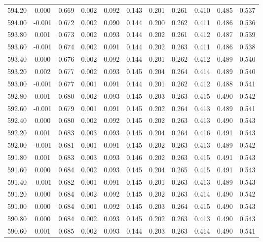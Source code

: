 \begin{longtable}{cccccccccc}
    594.20 &  0.000 &  0.669 &  0.002 &  0.092 &  0.143 &  0.201 &  0.261 &  0.410 &  0.485 &  0.537 \\
    594.00 & -0.001 &  0.672 &  0.002 &  0.090 &  0.144 &  0.200 &  0.262 &  0.411 &  0.486 &  0.536 \\
    593.80 &  0.001 &  0.673 &  0.002 &  0.093 &  0.144 &  0.202 &  0.261 &  0.412 &  0.487 &  0.539 \\
    593.60 & -0.001 &  0.674 &  0.002 &  0.091 &  0.144 &  0.202 &  0.263 &  0.411 &  0.486 &  0.538 \\
    593.40 &  0.000 &  0.676 &  0.002 &  0.092 &  0.144 &  0.201 &  0.262 &  0.412 &  0.489 &  0.540 \\
    593.20 &  0.002 &  0.677 &  0.002 &  0.093 &  0.145 &  0.204 &  0.264 &  0.414 &  0.489 &  0.540 \\
    593.00 & -0.001 &  0.677 &  0.001 &  0.091 &  0.144 &  0.201 &  0.262 &  0.412 &  0.488 &  0.541 \\
    592.80 &  0.001 &  0.680 &  0.002 &  0.093 &  0.145 &  0.203 &  0.263 &  0.415 &  0.490 &  0.542 \\
    592.60 & -0.001 &  0.679 &  0.001 &  0.091 &  0.145 &  0.202 &  0.264 &  0.413 &  0.489 &  0.541 \\
    592.40 &  0.000 &  0.680 &  0.002 &  0.092 &  0.145 &  0.202 &  0.263 &  0.413 &  0.490 &  0.543 \\
    592.20 &  0.001 &  0.683 &  0.003 &  0.093 &  0.145 &  0.204 &  0.264 &  0.416 &  0.491 &  0.543 \\
    592.00 & -0.001 &  0.681 &  0.001 &  0.091 &  0.145 &  0.202 &  0.263 &  0.413 &  0.489 &  0.542 \\
    591.80 &  0.001 &  0.683 &  0.003 &  0.093 &  0.146 &  0.202 &  0.263 &  0.415 &  0.491 &  0.543 \\
    591.60 &  0.000 &  0.684 &  0.002 &  0.093 &  0.145 &  0.204 &  0.265 &  0.415 &  0.491 &  0.543 \\
    591.40 & -0.001 &  0.682 &  0.001 &  0.091 &  0.145 &  0.201 &  0.263 &  0.413 &  0.489 &  0.543 \\
    591.20 &  0.000 &  0.684 &  0.002 &  0.092 &  0.145 &  0.202 &  0.263 &  0.414 &  0.490 &  0.542 \\
    591.00 &  0.000 &  0.684 &  0.001 &  0.092 &  0.145 &  0.203 &  0.264 &  0.415 &  0.490 &  0.543 \\
    590.80 &  0.000 &  0.684 &  0.002 &  0.093 &  0.145 &  0.202 &  0.263 &  0.413 &  0.490 &  0.543 \\
    590.60 &  0.001 &  0.685 &  0.002 &  0.093 &  0.144 &  0.203 &  0.263 &  0.414 &  0.490 &  0.541 \\

\end{longtable}
